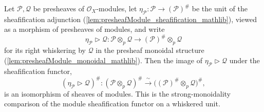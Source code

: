 \begin{lemma}
  \label{lem:isIso_sheafification_whiskerRight_unit}
  Let \(\mathcal{P}, \mathcal{Q}\) be presheaves of \(\mathcal{O}_X\)-modules,
  let \(\eta_{\mathcal{P}} : \mathcal{P} \to (\mathcal{P})^{\#}\) be the unit of
  the sheafification adjunction
  (\cref{lem:presheafModule_sheafification_mathlib}), viewed as a morphism of
  presheaves of modules, and write
  \[
    \eta_{\mathcal{P}} \rhd \mathcal{Q} :
    \mathcal{P} \otimes_p \mathcal{Q}
    \longrightarrow (\mathcal{P})^{\#} \otimes_p \mathcal{Q}
  \]
  for its right whiskering by \(\mathcal{Q}\) in the presheaf monoidal structure
  (\cref{lem:presheafModule_monoidal_mathlib}). Then the image of
  \(\eta_{\mathcal{P}} \rhd \mathcal{Q}\) under the sheafification functor,
  \[
    (\eta_{\mathcal{P}} \rhd \mathcal{Q})^{\#} :
    (\mathcal{P} \otimes_p \mathcal{Q})^{\#}
    \xrightarrow{\ \sim\ }
    \bigl((\mathcal{P})^{\#} \otimes_p \mathcal{Q}\bigr)^{\#},
  \]
  is an isomorphism of sheaves of modules. This is the strong-monoidality
  comparison of the module sheafification functor on a whiskered unit.
\end{lemma}

